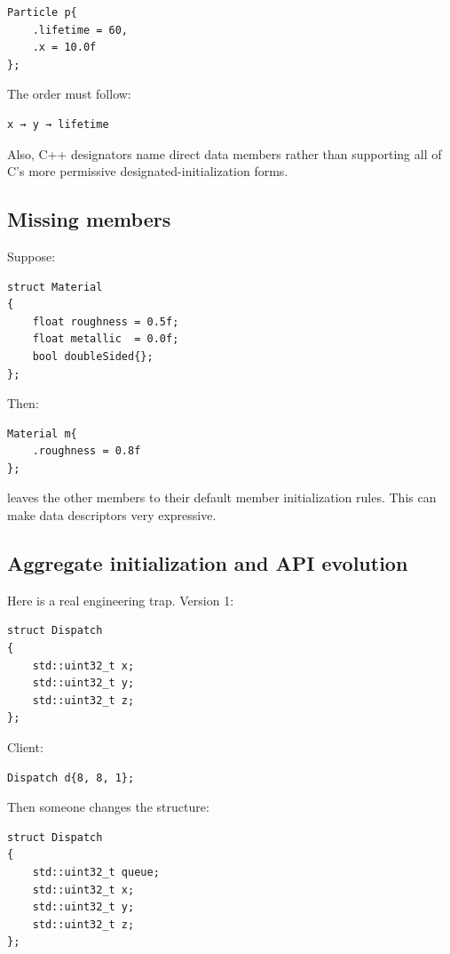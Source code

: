 \begin{verbatim}
Particle p{
    .lifetime = 60,
    .x = 10.0f
};
\end{verbatim}

The order must follow:

\begin{verbatim}
x → y → lifetime
\end{verbatim}

Also, C++ designators name direct data members rather than supporting all of C's more permissive designated-initialization forms.

\subsection{Missing members}\label{05-engine-i-ch003-missing-members}

Suppose:

\begin{verbatim}
struct Material
{
    float roughness = 0.5f;
    float metallic  = 0.0f;
    bool doubleSided{};
};
\end{verbatim}

Then:

\begin{verbatim}
Material m{
    .roughness = 0.8f
};
\end{verbatim}

leaves the other members to their default member initialization rules. This can make data descriptors very expressive.

\subsection{Aggregate initialization and API evolution}\label{05-engine-i-ch003-aggregate-initialization-and-api-evolution}

Here is a real engineering trap. Version 1:

\begin{verbatim}
struct Dispatch
{
    std::uint32_t x;
    std::uint32_t y;
    std::uint32_t z;
};
\end{verbatim}

Client:

\begin{verbatim}
Dispatch d{8, 8, 1};
\end{verbatim}

Then someone changes the structure:

\begin{verbatim}
struct Dispatch
{
    std::uint32_t queue;
    std::uint32_t x;
    std::uint32_t y;
    std::uint32_t z;
};
\end{verbatim}

